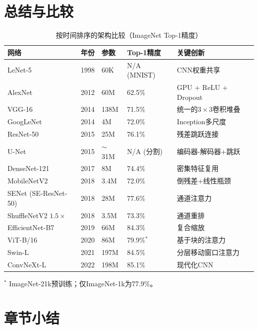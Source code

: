 \section{总结与比较}

\begin{table}[ht]
    \centering
    \caption{按时间排序的架构比较（ImageNet Top-1精度）}
    \begin{tabular}{L{2.8cm} L{1.3cm} L{2cm} L{2.5cm} L{4cm}}
        \toprule
        \textbf{网络} & \textbf{年份} & \textbf{参数} & \textbf{Top-1精度} & \textbf{关键创新} \\
        \midrule
        LeNet-5 & 1998 & 60K & N/A (MNIST) & CNN权重共享 \\
        AlexNet & 2012 & 60M & 62.5\% & GPU + ReLU + Dropout \\
        VGG-16 & 2014 & 138M & 71.5\% & 统一的$3\times3$卷积堆叠 \\
        GoogLeNet & 2014 & 4M & 72.0\% & Inception多尺度 \\
        ResNet-50 & 2015 & 25M & 76.1\% & 残差跳跃连接 \\
        U-Net & 2015 & $\sim$31M & N/A (分割) & 编码器-解码器+跳跃 \\
        DenseNet-121 & 2017 & 8M & 74.4\% & 密集特征复用 \\
        MobileNetV2 & 2018 & 3.4M & 72.0\% & 倒残差+线性瓶颈 \\
        SENet (SE-ResNet-50) & 2018 & 28M & 77.6\% & 通道注意力 \\
        ShuffleNetV2 $1.5\times$ & 2018 & 3.5M & 73.3\% & 通道重排 \\
        EfficientNet-B7 & 2019 & 66M & 84.3\% & 复合缩放 \\
        ViT-B/16 & 2020 & 86M & 79.9\%$^*$ & 基于块的注意力 \\
        Swin-L & 2021 & 197M & 84.5\% & 分层移动窗口注意力 \\
        ConvNeXt-L & 2022 & 198M & 85.1\% & 现代化CNN \\
        \bottomrule
    \end{tabular}
    \footnotesize{$^*$ ImageNet-21k预训练；仅ImageNet-1k为77.9\%。}
\end{table}

\section{章节小结}

